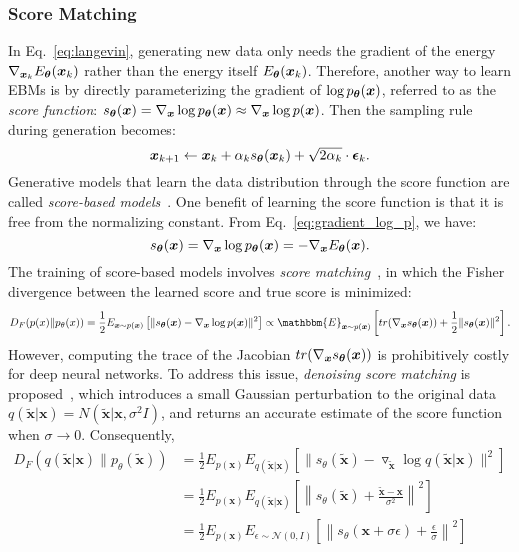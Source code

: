 \subsubsection{Score Matching}
In Eq.~\eqref{eq:langevin}, generating new data only needs the gradient of the energy $\nabla_{\bm{x}_k}E_{\bm{\theta}}(\bm{x}_k)$ rather than the energy itself $E_{\bm{\theta}}(\bm{x}_k)$. Therefore, another way to learn EBMs is by directly parameterizing the gradient of $\log p_{\bm{\theta}}(\bm{x})$, referred to as the \emph{score function}: $s_{\bm{\theta}}(\bm{x})=\nabla_{\bm{x}}\log p_{\bm{\theta}}(\bm{x})\approx\nabla_{\bm{x}}\log p(\bm{x})$. Then the sampling rule during generation becomes:
\begin{equation}
    \bm{x}_{k+1} \gets \bm{x}_k+\alpha_ks_{\bm{\theta}}(\bm{x}_k)+\sqrt{2\alpha_k}\cdot\bm{\epsilon}_k.
\label{eq:langevin_score_matching}
\end{equation}
Generative models that learn the data distribution through the score function are called \emph{score-based models}~\citep{song2019generative}. One benefit of learning the score function is that it is free from the normalizing constant. From Eq.~\eqref{eq:gradient_log_p}, we have:
\begin{equation}
    s_{\bm{\theta}}(\bm{x})=\nabla_{\bm{x}}\log p_{\bm{\theta}}(\bm{x})=-\nabla_{\bm{x}}E_{\bm{\theta}}(\bm{x}).
\end{equation}
The training of score-based models involves \emph{score matching}~\citep{hyvarinen2005estimation}, in which the Fisher divergence between the learned score and true score is minimized:
\begin{equation}
    D_F(p(x) \| p_{\theta}(x)) = \frac{1}{2}E_{\bm{x}\sim p(\bm{x})}\left[\|s_{\mparam}(\bm{x})-\nabla_{\bm{x}}\log p(\bm{x})\|^2\right]\propto\mathbbm{E}_{\bm{x}\sim p(\bm{x})}\left[tr(\nabla_{\bm{x}}s_{\mparam}(\bm{x}))+\frac{1}{2}\|s_{\mparam}(\bm{x})\|^2\right].
\end{equation}
However, computing the trace of the Jacobian $tr(\nabla_{\bm{x}}s_{\bm{\theta}}(\bm{x}))$ is prohibitively costly for deep neural networks. To address this issue, \emph{denoising score matching} is proposed~\citep{vincent2011connection}, which introduces a small Gaussian perturbation to the original data $q(\tilde{\bm{x}}|\bm{x}) = N(\tilde{\bm{x}}|\bm{x}, \sigma^2I)$, and returns an accurate estimate of the score function when $\sigma \rightarrow 0$. Consequently,
\begin{align}
D_F(q(\tilde{\bm{x}}|\bm{x}) \| p_{\theta}(\tilde{\bm{x}})) 
&= \frac{1}{2} E_{p(\bm{x})}E_{q(\tilde{\bm{x}} | \bm{x})}[\| s_{\theta}(\tilde{\bm{x}}) - \triangledown_{\tilde{\bm{x}}} \log q(\tilde{\bm{x}} | \bm{x})\|^2]\nonumber \\
&= \frac{1}{2} E_{p(\bm{x})}E_{q(\tilde{\bm{x}} | \bm{x})}\left[\left\| s_{\theta}(\tilde{\bm{x}}) + \frac{\tilde{\bm{x}} - \bm{x}}{\sigma^2}\right\|^2\right]\nonumber\\
&=\frac{1}{2} E_{p(\bm{x})}E_{\epsilon\sim\mathcal{N}(0,I)}\left[\left\| s_{\theta}(\bm{x}+\sigma\epsilon) + \frac{\epsilon}{\sigma}\right\|^2\right]\label{eq:fisher-divergence}
\end{align}
